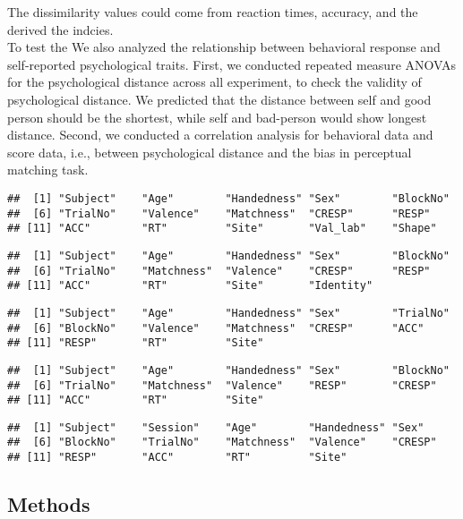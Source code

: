 \documentclass[man]{apa6}
\begin{document}
The dissimilarity values could come from reaction times, accuracy, and the derived the indcies.\\
To test the We also analyzed the relationship between behavioral response and self-reported psychological traits. First, we conducted repeated measure ANOVAs for the psychological distance across all experiment, to check the validity of psychological distance. We predicted that the distance between self and good person should be the shortest, while self and bad-person would show longest distance. Second, we conducted a correlation analysis for behavioral data and score data, i.e., between psychological distance and the bias in perceptual matching task.

\begin{verbatim}
##  [1] "Subject"    "Age"        "Handedness" "Sex"        "BlockNo"   
##  [6] "TrialNo"    "Valence"    "Matchness"  "CRESP"      "RESP"      
## [11] "ACC"        "RT"         "Site"       "Val_lab"    "Shape"
\end{verbatim}

\begin{verbatim}
##  [1] "Subject"    "Age"        "Handedness" "Sex"        "BlockNo"   
##  [6] "TrialNo"    "Matchness"  "Valence"    "CRESP"      "RESP"      
## [11] "ACC"        "RT"         "Site"       "Identity"
\end{verbatim}

\begin{verbatim}
##  [1] "Subject"    "Age"        "Handedness" "Sex"        "TrialNo"   
##  [6] "BlockNo"    "Valence"    "Matchness"  "CRESP"      "ACC"       
## [11] "RESP"       "RT"         "Site"
\end{verbatim}

\begin{verbatim}
##  [1] "Subject"    "Age"        "Handedness" "Sex"        "BlockNo"   
##  [6] "TrialNo"    "Matchness"  "Valence"    "RESP"       "CRESP"     
## [11] "ACC"        "RT"         "Site"
\end{verbatim}

\begin{verbatim}
##  [1] "Subject"    "Session"    "Age"        "Handedness" "Sex"       
##  [6] "BlockNo"    "TrialNo"    "Matchness"  "Valence"    "CRESP"     
## [11] "RESP"       "ACC"        "RT"         "Site"
\end{verbatim}

\hypertarget{methods-3}{%
\subsection{Methods}\label{methods-3}}
\end{document}

